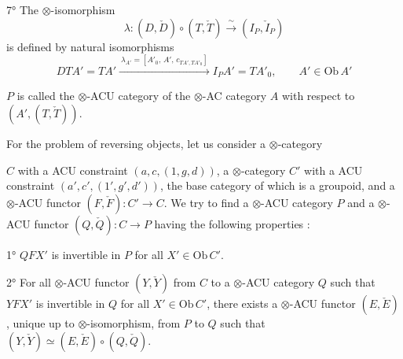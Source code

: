 \documentclass[11pt,a4paper]{article}
\begin{document}



7° The $\otimes$-isomorphism
\[
\lambda : (D, \check{D}) \circ (T, \check{T}) \xrightarrow{\ \sim\ }
(I_{P}, \check{I}_{P})
\]
is defined by natural isomorphisms
\[
DTA' = TA'
\xrightarrow{\ \lambda_{A'} = [A'_{0},\, A',\, c_{TA', TA'_{0}}]\ }
I_{P} A' = TA'_{0}, \qquad A' \in \mathrm{Ob}\,A'
\]

$P$ is called the $\otimes$-ACU category of the $\otimes$-AC category $A$
with respect to $(A', (T, \check{T}))$.

For the problem of reversing objects, let us consider a $\otimes$-category

$C$ with a ACU constraint $(a, c, (1, g, d))$, a $\otimes$-category $C'$
with a ACU constraint $(a', c', (1', g', d'))$, the base category of which
is a groupoid, and a $\otimes$-ACU functor $(F, \check{F}) : C' \to C$. We
try to find a $\otimes$-ACU category $P$ and a $\otimes$-ACU functor $(Q,
\check{Q}) : C \to P$ having the following properties :

1° $QFX'$ is invertible in $P$ for all $X' \in \mathrm{Ob}\,C'$.

2° For all $\otimes$-ACU functor $(Y, \check{Y})$ from $C$ to a
$\otimes$-ACU category $Q$ such that $YFX'$ is invertible in $Q$ for all
$X' \in \mathrm{Ob}\,C'$, there exists a $\otimes$-ACU functor $(E,
\check{E})$, unique up to $\otimes$-isomorphism, from $P$ to $Q$ such
that $(Y, \check{Y}) \simeq (E, \check{E}) \circ (Q, \check{Q})$.
\end{document}
